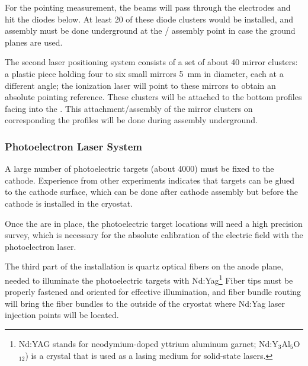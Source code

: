 For the pointing measurement, the beams will pass through the  electrodes and hit the diodes below. At least \num{20} of these diode clusters would be installed, and assembly must be done underground at the / assembly point in case the ground planes are used.


The second laser positioning system consists of a set of about \num{40} mirror clusters: a plastic piece holding four to six small mirrors \SI{5}{\mm} in diameter, each at a different angle; the ionization laser will point to these mirrors to obtain an absolute pointing reference. These clusters will be attached to the bottom  profiles facing into the . 
This attachment/assembly of the mirror clusters on corresponding the  profiles will be done during  assembly underground.



\subsubsection{Photoelectron Laser System} 
A large number of photoelectric targets (about \num{4000}) must be fixed to the cathode. Experience from other experiments indicates that targets can be glued to the cathode surface, which can be done after cathode assembly but before the cathode is installed in the cryostat. 

Once the  are in place, the photoelectric target locations will need a high precision survey, which is necessary for the absolute calibration of the electric field with the photoelectron laser. 

The third part of the installation is  quartz optical fibers on the anode plane, needed to illuminate  the photoelectric targets with Nd:Yag\footnote{Nd:YAG stands for neodymium-doped yttrium aluminum garnet; Nd:Y$_{3}$Al$_{5}$O$_{12}$) is a crystal that is used as a lasing medium for solid-state lasers.}
Fiber tips must be properly fastened and oriented for effective illumination, and fiber bundle routing will bring the fiber bundles to the outside of the cryostat where Nd:Yag laser injection points will be located. 

